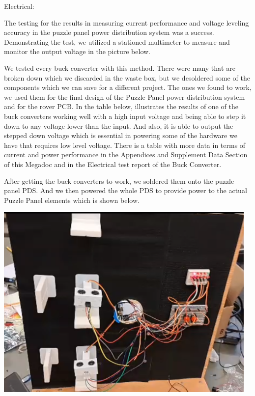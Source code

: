 \documentclass[a4paper, 10pt]{article}
\begin{document}
Electrical:

The testing for the results in measuring current performance and voltage leveling accuracy in the puzzle panel power distribution system was a success. Demonstrating the test, we utilized a stationed multimeter to measure and monitor the output voltage in the picture below. 


We tested every buck converter with this method. There were many that are broken down which we discarded in the waste box, but we desoldered some of the components which we can save for a different project. The ones we found to work, we used them for the final design of the Puzzle Panel power distribution system and for the rover PCB. In the table below, illustrates the results of one of the buck converters working well with a high input voltage and being able to step it down to any voltage lower than the input. And also, it is able to output the stepped down voltage which is essential in powering some of the hardware we have that requires low level voltage. There is a table with more data in terms of current and power performance in the Appendices and Supplement Data Section of this Megadoc and in the Electrical test report of the Buck Converter.


After getting the buck converters to work, we soldered them onto the puzzle panel PDS. And we then powered the whole PDS to provide power to the actual Puzzle Panel elements which is shown below. 

\includegraphics[scale=0.85]{Photos/Puzzle Panel Powered}
\end{document}
